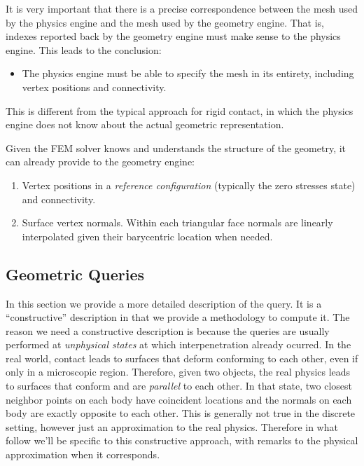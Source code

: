 \documentclass[a4paper]{article}
\begin{document}
It is very important that there is a precise correspondence
between the mesh used by the physics engine and the mesh used by the geometry
engine. That is, indexes reported back by the geometry engine must make sense to
the physics engine. This leads to the conclusion: 
\begin{itemize}
	\item The physics engine must be able to specify the mesh in its entirety,
	including vertex positions and connectivity.
\end{itemize}

This is different from the typical approach for rigid contact, in which the
physics engine does not know about the actual geometric representation.

Given the FEM solver knows and understands the structure of the geometry, it can
already provide to the geometry engine:
\begin{enumerate}
	\item Vertex positions in a \textit{reference configuration} (typically
	the zero stresses state) and connectivity.
	\item Surface vertex normals. Within each triangular face normals are
	linearly interpolated given their barycentric location when needed.
\end{enumerate}

\subsection{Geometric Queries}
\label{sec:geometric_queries}

In this section we provide a more detailed description of the query. It is a
``constructive'' description in that we provide a methodology to compute it. The
reason we need a constructive description is because the queries are usually
performed at \textit{unphysical states} at which interpenetration already
ocurred. In the real world, contact leads to surfaces that deform conforming to
each other, even if only in a microscopic region. Therefore, given two objects,
the real physics leads to surfaces that conform and are \textit{parallel} to
each other. In that state, two closest neighbor points on each body have
coincident locations and the normals on each body are exactly opposite to each
other. This is generally not true in the discrete setting, however just an
approximation to the real physics. Therefore in what follow we'll be specific to
this constructive approach, with remarks to the physical approximation when it
corresponds. 
\end{document}
